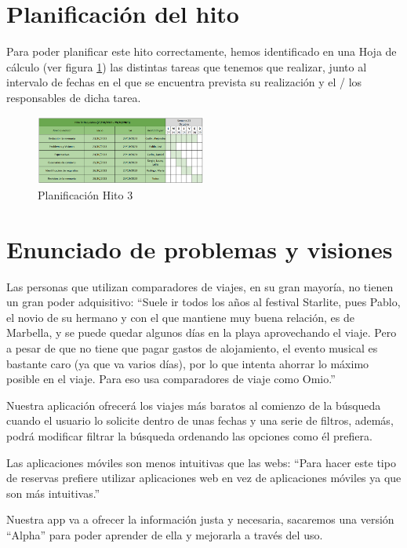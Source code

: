 \section{Planificación del hito}
Para poder planificar este hito correctamente, hemos identificado en una Hoja de cálculo (ver figura \ref{fig:planif-hito3}) las distintas tareas que tenemos que 
realizar, junto al intervalo de fechas en el que se encuentra prevista su realización y el / los responsables de dicha tarea.
\begin{figure}[H]
    \centering 
    \includegraphics[width=0.5\textwidth]{./Imagenes/Planificaciones/Planif-hito3.png}
    \caption{Planificación Hito 3}
    \label{fig:planif-hito3}
\end{figure}

\section{Enunciado de problemas y visiones}

\begin{problema}

    Las personas que utilizan comparadores de viajes, en su gran mayoría, no tienen un gran poder adquisitivo: ``Suele ir todos los años al festival Starlite, pues Pablo, el novio de su hermano y con el que mantiene muy buena relación, es de Marbella, y se puede quedar algunos días en la playa aprovechando el viaje. Pero a pesar de que no tiene que pagar gastos de alojamiento, el evento musical es bastante caro (ya que va varios días), por lo que intenta ahorrar lo máximo posible en el viaje. Para eso usa comparadores de viaje como Omio.''

    {\centering\begin{vision}
    Nuestra aplicación ofrecerá los viajes más baratos al comienzo de la búsqueda cuando el usuario lo solicite dentro de unas fechas y una serie de filtros, además, podrá modificar filtrar la búsqueda ordenando las opciones como él prefiera.
    \end{vision}}
    \end{problema}
    
    \begin{problema}

    Las aplicaciones móviles son menos intuitivas que las webs: ``Para hacer este tipo de reservas prefiere utilizar aplicaciones web en vez de aplicaciones móviles ya que son más intuitivas.''

    {\centering\begin{vision}
    Nuestra app va a ofrecer la información justa y necesaria, sacaremos una versión ``Alpha'' para poder aprender de ella y mejorarla a través del uso.
    \end{vision}}
    \end{problema}


